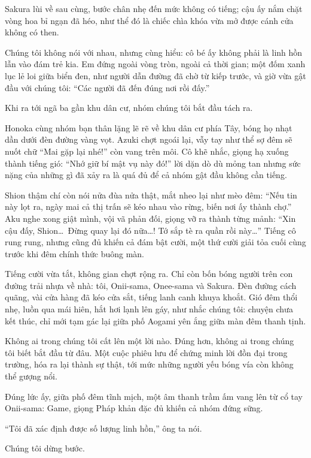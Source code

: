 \documentclass[../main.tex]{subfiles}
\begin{document}
Sakura lùi về sau cùng, bước chân nhẹ đến mức không có tiếng; cậu ấy nắm chặt vòng hoa bỉ ngạn đã héo, như thể đó là chiếc chìa khóa vừa mở được cánh cửa không có then.

Chúng tôi không nói với nhau, nhưng cùng hiểu: cô bé ấy không phải là linh hồn lẫn vào đám trẻ kia. Em đứng ngoài vòng tròn, ngoài cả thời gian; một đốm xanh lục lẻ loi giữa biển đen, như người dẫn đường đã chờ từ kiếp trước, và giờ vừa gật đầu với chúng tôi: ``Các người đã đến đúng nơi rồi đấy.''

Khi ra tới ngã ba gần khu dân cư, nhóm chúng tôi bắt đầu tách ra.

Honoka cùng nhóm bạn thân lặng lẽ rẽ về khu dân cư phía Tây, bóng họ nhạt dần dưới đèn đường vàng vọt. Azuki chợt ngoái lại, vẫy tay như thể sợ đêm sẽ nuốt chữ ``Mai gặp lại nhé!'' còn vang trên môi. Cô khẽ nhắc, giọng hạ xuống thành tiếng gió: ``Nhớ giữ bí mật vụ này đó!'' lời dặn dò dù mỏng tan nhưng sức nặng của những gì đã xảy ra là quá đủ để cả nhóm gật đầu không cần tiếng.

Shion thậm chí còn nói nửa đùa nửa thật, mắt nheo lại như mèo đêm: ``Nếu tin này lọt ra, ngày mai cả thị trấn sẽ kéo nhau vào rừng, biến nơi ấy thành chợ.'' Aku nghe xong giật mình, vội vã phản đối, giọng vỡ ra thành từng mảnh: ``Xin cậu đấy, Shion\dots\ Đừng quay lại đó nữa\dots! Tớ sắp tè ra quần rồi này\dots'' Tiếng cô rung rung, nhưng cũng đủ khiến cả đám bật cười, một thứ cười giải tỏa cuối cùng trước khi đêm chính thức buông màn.

Tiếng cười vừa tắt, không gian chợt rộng ra. Chỉ còn bốn bóng người trên con đường trải nhựa về nhà: tôi, Onii-sama, Onee-sama và Sakura. Đèn đường cách quãng, vài cửa hàng đã kéo cửa sắt, tiếng lanh canh khuya khoắt. Gió đêm thổi nhẹ, luồn qua mái hiên, hắt hơi lạnh lên gáy, như nhắc chúng tôi: chuyện chưa kết thúc, chỉ mới tạm gác lại giữa phố Aogami yên ắng giữa màn đêm thanh tịnh.

Không ai trong chúng tôi cất lên một lời nào. Đúng hơn, không ai trong chúng tôi biết bắt đầu từ đâu. Một cuộc phiêu lưu để chứng minh lời đồn đại trong trường, hóa ra lại thành sự thật, tới mức những người yếu bóng vía còn không thể gượng nổi.

Đúng lức ấy, giữa phố đêm tĩnh mịch, một âm thanh trầm ấm vang lên từ cổ tay Onii-sama: Game, giọng Pháp khản đặc đủ khiến cả nhóm đứng sững.

``Tôi đã xác định được số lượng linh hồn,'' ông ta nói.

Chúng tôi dừng bước.
\end{document}
